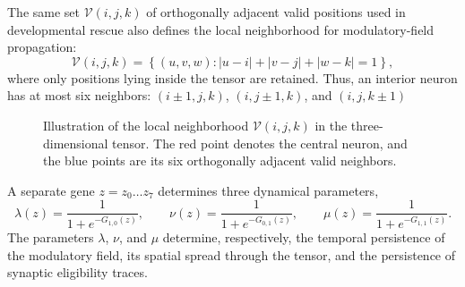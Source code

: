 \documentclass[12pt,a4paper]{article}
\begin{document}
\begin{enumerate}
	The same set $\mathcal{V}(i,j,k)$ of orthogonally adjacent valid positions used in developmental rescue also defines the local neighborhood for modulatory-field propagation:
	$$\mathcal{V}(i,j,k)=\left\{ (u,v,w): |u-i|+|v-j|+|w-k| = 1\right\},$$
where only positions lying inside the tensor are retained. Thus, an interior neuron has at most six neighbors: $(i\pm1,j,k)$, $(i,j\pm1,k)$, and $(i,j,k\pm1)$ 

	\begin{figure}[h]
	\centering
	\caption{\footnotesize{Illustration of the local neighborhood $\mathcal{V}(i,j,k)$ in the three-dimensional tensor. The red point denotes the central neuron, and the blue points are its six orthogonally adjacent valid neighbors.}}
	\label{fig:local_neighborhood}
	\end{figure}

	A separate gene $z=z_0\ldots z_7$ determines three dynamical parameters,
	$$\lambda(z)=\frac{1}{1+e^{-G_{1,0}(z)}},\qquad \nu(z)=\frac{1}{1+e^{-G_{0,1}(z)}},\qquad \mu(z)=\frac{1}{1+e^{-G_{1,1}(z)}}.$$
	The parameters $\lambda$, $\nu$, and $\mu$ determine, respectively, the temporal persistence of the modulatory field, its spatial spread through the tensor, and the persistence of synaptic eligibility traces. 
	

\end{enumerate}
\end{document}

